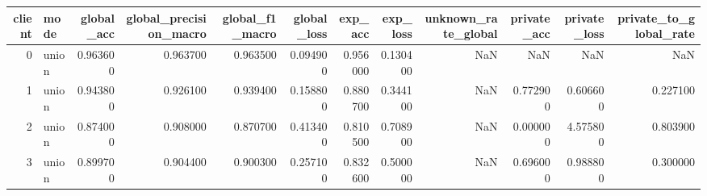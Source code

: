 \begin{tabular}{rlrrrrrrrrrr}
\toprule
client & mode & global_acc & global_precision_macro & global_f1_macro & global_loss & exp_acc & exp_loss & unknown_rate_global & private_acc & private_loss & private_to_global_rate \\
\midrule
0 & union & 0.963600 & 0.963700 & 0.963500 & 0.094900 & 0.956000 & 0.130400 & NaN & NaN & NaN & NaN \\
1 & union & 0.943800 & 0.926100 & 0.939400 & 0.158800 & 0.880700 & 0.344100 & NaN & 0.772900 & 0.606600 & 0.227100 \\
2 & union & 0.874000 & 0.908000 & 0.870700 & 0.413400 & 0.810500 & 0.708900 & NaN & 0.000000 & 4.575800 & 0.803900 \\
3 & union & 0.899700 & 0.904400 & 0.900300 & 0.257100 & 0.832600 & 0.500000 & NaN & 0.696000 & 0.988800 & 0.300000 \\
\bottomrule
\end{tabular}
